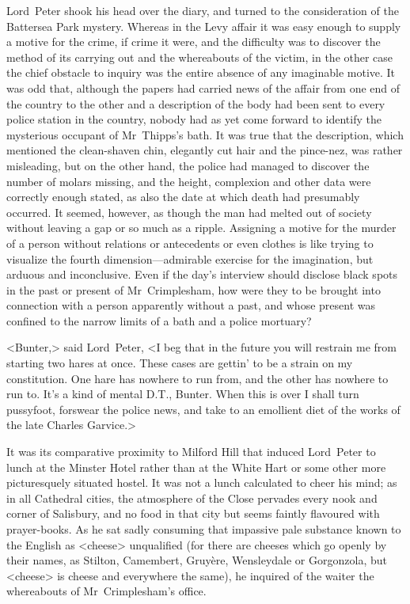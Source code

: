 Lord~Peter shook his head over the diary, and turned to the consideration of the Battersea Park mystery. Whereas in the Levy affair it was easy enough to supply a motive for the crime, if crime it were, and the difficulty was to discover the method of its carrying out and the whereabouts of the victim, in the other case the chief obstacle to inquiry was the entire absence of any imaginable motive. It was odd that, although the papers had carried news of the affair from one end of the country to the other and a description of the body had been sent to every police station in the country, nobody had as yet come forward to identify the mysterious occupant of Mr~Thipps's bath. It was true that the description, which mentioned the clean-shaven chin, elegantly cut hair and the pince-nez, was rather misleading, but on the other hand, the police had managed to discover the number of molars missing, and the height, complexion and other data were correctly enough stated, as also the date at which death had presumably occurred. It seemed, however, as though the man had melted out of society without leaving a gap or so much as a ripple. Assigning a motive for the murder of a person without relations or antecedents or even clothes is like trying to visualize the fourth dimension—admirable exercise for the imagination, but arduous and inconclusive. Even if the day's interview should disclose black spots in the past or present of Mr~Crimplesham, how were they to be brought into connection with a person apparently without a past, and whose present was confined to the narrow limits of a bath and a police mortuary?

<Bunter,> said Lord~Peter, <I beg that in the future you will restrain me from starting two hares at once. These cases are gettin' to be a strain on my constitution. One hare has nowhere to run from, and the other has nowhere to run to. It's a kind of mental D\@.T\@., Bunter. When this is over I shall turn pussyfoot, forswear the police news, and take to an emollient diet of the works of the late Charles Garvice.>

It was its comparative proximity to Milford Hill that induced Lord~Peter to lunch at the Minster Hotel rather than at the White Hart or some other more picturesquely situated hostel. It was not a lunch calculated to cheer his mind; as in all Cathedral cities, the atmosphere of the Close pervades every nook and corner of Salisbury, and no food in that city but seems faintly flavoured with prayer-books. As he sat sadly consuming that impassive pale substance known to the English as <cheese> unqualified (for there are cheeses which go openly by their names, as Stilton, Camembert, Gruyère, Wensleydale or Gorgonzola, but <cheese> is cheese and everywhere the same), he inquired of the waiter the whereabouts of Mr~Crimplesham's office.

